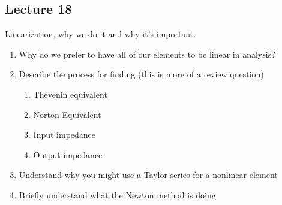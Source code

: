 \subsection*{Lecture 18}
Linearization, why we do it and why it's important.

\begin{enumerate}
  \item Why do we prefer to have all of our elements to be linear in analysis?
  \item Describe the process for finding (this is more of a review question)
  \begin{enumerate}
    \item Thevenin equivalent
    \item Norton Equivalent
    \item Input impedance
    \item Output impedance
  \end{enumerate}
  \item Understand why you might use a Taylor series for a nonlinear element
  \item Briefly understand what the Newton method is doing
\end{enumerate}